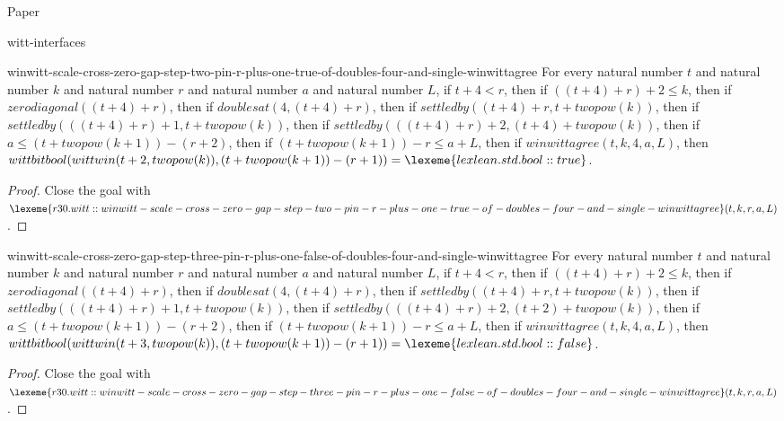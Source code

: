 \begin{lexlean}{Paper}
\begin{section}{witt-interfaces}
  \begin{theorem}{winwitt-scale-cross-zero-gap-step-two-pin-r-plus-one-true-of-doubles-four-and-single-winwittagree}
  For every natural number \(t\) and natural number \(k\) and natural number \(r\) and natural number \(a\) and natural number \(L\), if \(t + 4 < r\), then if \(((t + 4) + r) + 2 ≤ k\), then if \(zerodiagonal((t + 4) + r)\), then if \(doublesat(4, (t + 4) + r)\), then if \(settledby((t + 4) + r, t + twopow(k))\), then if \(settledby(((t + 4) + r) + 1, t + twopow(k))\), then if \(settledby(((t + 4) + r) + 2, (t + 4) + twopow(k))\), then if \(a ≤ (t + twopow(k + 1)) - (r + 2)\), then if \((t + twopow(k + 1)) - r ≤ a + L\), then if \(winwittagree(t, k, 4, a, L)\), then \(wittbitbool(wittwin(t + 2, twopow(k)), (t + twopow(k + 1)) - (r + 1)) = \lexeme{lexlean.std.bool::true}\).
  \begin{proof}
  Close the goal with \(\lexeme{r30.witt::winwitt-scale-cross-zero-gap-step-two-pin-r-plus-one-true-of-doubles-four-and-single-winwittagree}(t, k, r, a, L)\).
  \end{proof}
  \end{theorem}

  \begin{theorem}{winwitt-scale-cross-zero-gap-step-three-pin-r-plus-one-false-of-doubles-four-and-single-winwittagree}
  For every natural number \(t\) and natural number \(k\) and natural number \(r\) and natural number \(a\) and natural number \(L\), if \(t + 4 < r\), then if \(((t + 4) + r) + 2 ≤ k\), then if \(zerodiagonal((t + 4) + r)\), then if \(doublesat(4, (t + 4) + r)\), then if \(settledby((t + 4) + r, t + twopow(k))\), then if \(settledby(((t + 4) + r) + 1, t + twopow(k))\), then if \(settledby(((t + 4) + r) + 2, (t + 2) + twopow(k))\), then if \(a ≤ (t + twopow(k + 1)) - (r + 2)\), then if \((t + twopow(k + 1)) - r ≤ a + L\), then if \(winwittagree(t, k, 4, a, L)\), then \(wittbitbool(wittwin(t + 3, twopow(k)), (t + twopow(k + 1)) - (r + 1)) = \lexeme{lexlean.std.bool::false}\).
  \begin{proof}
  Close the goal with \(\lexeme{r30.witt::winwitt-scale-cross-zero-gap-step-three-pin-r-plus-one-false-of-doubles-four-and-single-winwittagree}(t, k, r, a, L)\).
  \end{proof}
  \end{theorem}


\end{section}
\end{lexlean}
